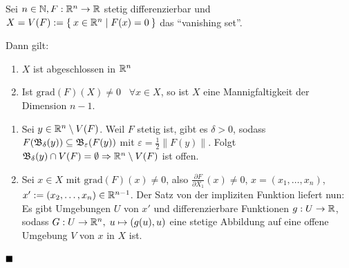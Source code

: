 \begin{korollar}
    Sei $n \in \mathbb{N}, F:\mathbb{R}^n \rightarrow \mathbb{R}$ stetig differenzierbar
    und $X = V(F) := \Set{x \in \ensuremath{\mathbb{R}}^n | F(x) = 0}$ das \enquote{vanishing set}.

    Dann gilt:
    \begin{enumerate}[label=\alph*),ref=\theplaindefinition.\alph*]
        \item $X$ ist abgeschlossen in $\mathbb{R}^n$
        \item Ist $\text{grad}(F)(X) \neq 0 \;\;\;\forall{x \in X}$, so ist
              $X$ eine Mannigfaltigkeit der Dimension $n-1$.  \label{Mannigfaltigkeitskriterium}
    \end{enumerate}
\end{korollar}

\begin{beweis}\leavevmode
    \begin{enumerate}[label=\alph*),ref=\theplaindefinition.\alph*]
        \item Sei $y \in \mathbb{R}^n \setminus V(F)$. Weil $F$ stetig ist,
              gibt es $\delta > 0$, sodass $F(\mathfrak{B}_\delta(y)) \subseteq \mathfrak{B}_\varepsilon(F(y))$
              mit $\varepsilon = \frac{1}{2} \|F(y)\|$. Folgt
              $\mathfrak{B}_\delta(y) \cap V(F) = \emptyset \Rightarrow \mathbb{R}^n \setminus V(F)$
              ist offen.
        \item Sei $x \in X$ mit $\text{grad}(F)(x) \neq 0$, also
              \obda $\frac{\partial F}{\partial X_1} (x) \neq 0$,
              $x = (x_1, \dots, x_n)$, $x' := (x_2, \dots, x_n) \in \mathbb{R}^{n-1}$.
              Der Satz von der impliziten Funktion liefert nun:
              Es gibt Umgebungen $U$ von $x'$ und differenzierbare
              Funktionen $g: U \rightarrow \mathbb{R}$, sodass
              $G: U \rightarrow \mathbb{R}^n, \; u \mapsto (g(u), u)$
              eine stetige Abbildung auf eine offene Umgebung $V$ von
              $x$ in $X$ ist.
    \end{enumerate}  
    $\qed$
\end{beweis}

